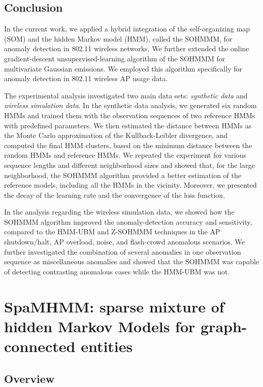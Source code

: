 \subsection{Conclusion}
\label{sec:sohmmm_conclusion}

In the current work, we applied a hybrid integration of the self-organizing map (SOM) and the hidden Markov model (HMM), called the SOHMMM, for anomaly detection in 802.11 wireless networks. We further extended the online gradient-descent unsupervised-learning algorithm of the SOHMMM for multivariate Gaussian emissions. We employed this algorithm specifically for anomaly detection in 802.11 wireless AP usage data.

The experimental analysis investigated two main data sets: \textit{synthetic data} and \textit{wireless simulation data}. In the synthetic data analysis, we generated six random HMMs and trained them with the observation sequences of two reference HMMs with predefined parameters. We then estimated the distance between HMMs as the Monte Carlo approximation of the Kullback-Leibler divergence, and computed the final HMM clusters, based on the minimum distance between the random HMMs and reference HMMs. We repeated the experiment for various sequence lengths and different neighborhood sizes and showed that, for the large neighborhood, the SOHMMM algorithm provided a better estimation of the reference models, including all the HMMs in the vicinity. Moreover, we presented the decay of the learning rate and the convergence of the loss function.

In the analysis regarding the wireless simulation data, we showed how the SOHMMM algorithm improved the anomaly-detection accuracy and sensitivity, compared to the HMM-UBM and Z-SOHMMM techniques in the AP shutdown/halt, AP overload, noise, and flash-crowd anomalous scenarios. We further investigated the combination of several anomalies in one observation sequence as miscellaneous anomalies and showed that the SOHMMM was capable of detecting contrasting anomalous cases while the HMM-UBM was not.

\section{SpaMHMM: sparse mixture of hidden Markov Models for graph-connected entities}
\label{sec:spamhmm}

\subsection{Overview}

